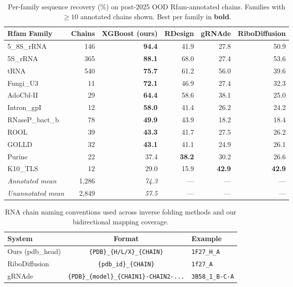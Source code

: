 \begin{table}[t]
\centering
\caption{Per-family sequence recovery (\%) on post-2025 OOD Rfam-annotated chains. Families with $\geq 10$ annotated chains shown. Best per family in \textbf{bold}.}
\label{tab:per_family}
\begin{tabular}{lrrrrr}
\toprule
\bfseries Rfam Family & \bfseries Chains & \bfseries XGBoost (ours) & \bfseries RDesign & \bfseries gRNAde & \bfseries RiboDiffusion \\
\midrule
5\_8S\_rRNA  & 146 & \bf{94.4} & 41.9 & 27.8 & 50.9 \\
5S\_rRNA    & 365 & \bf{88.1} & 68.0 & 27.4 & 53.6 \\
tRNA        & 540 & \bf{75.7} & 61.2 & 56.0 & 39.6 \\
Fungi\_U3   &  11 & \bf{72.1} & 46.9 & 27.4 & 32.3 \\
AdoCbl-II   &  29 & \bf{64.4} & 58.6 & 38.1 & 25.0 \\
Intron\_gpI  &  12 & \bf{58.0} & 41.4 & 26.2 & 24.2 \\
RNaseP\_bact\_b & 78 & \bf{49.9} & 43.9 & 18.2 & 18.4 \\
ROOL        &  39 & \bf{43.3} & 41.7 & 27.5 & 26.2 \\
GOLLD       &  32 & \bf{43.1} & 41.1 & 24.9 & 26.1 \\
Purine      &  22 & 37.4 & \bf{38.2} & 30.2 & 26.6 \\
K10\_TLS     &  12 & 29.0 & 15.9 & \bf{42.9} & \bf{42.9} \\
\midrule
\emph{Annotated mean} & 1,286 & \emph{74.3} & --- & --- & --- \\
\emph{Unannotated mean} & 2,849 & \emph{57.5} & --- & --- & --- \\
\bottomrule
\end{tabular}
\end{table}


\begin{table}[t]
\centering
\caption{RNA chain naming conventions used across inverse folding methods and our bidirectional mapping coverage.}
\label{tab:chain_mapping}
\begin{tabular}{lcl}
\toprule
\bfseries System & \bfseries Format & \bfseries Example \\
\midrule
Ours (pdb\_head) & \texttt{\{PDB\}\_\{H/L/X\}\_\{CHAIN\}} & \texttt{1F27\_H\_A} \\
RiboDiffusion & \texttt{\{pdb\_id\}\_\{CHAIN\}} & \texttt{1f27\_A} \\
gRNAde & \texttt{\{PDB\}\_\{model\}\_\{CHAIN1\}-CHAIN2-...} & \texttt{3B58\_1\_B-C-A} \\
\bottomrule
\end{tabular}
\end{table}
